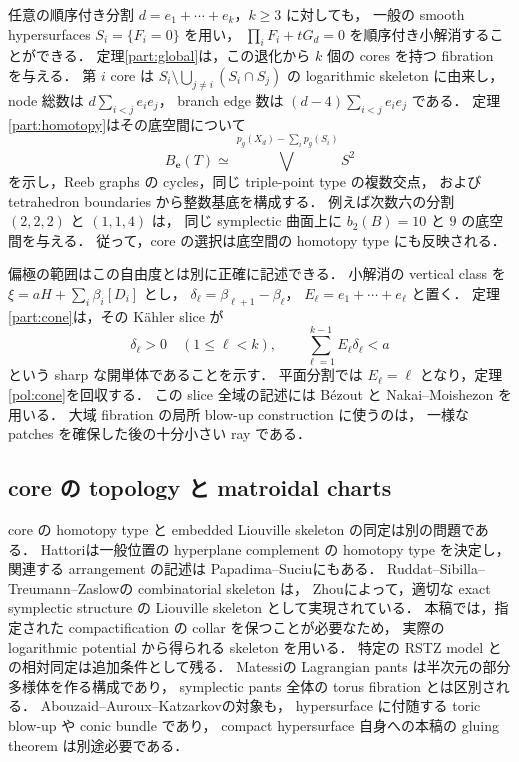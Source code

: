 任意の順序付き分割 $d=e_1+\cdots+e_k$，$k\geq3$ に対しても，
一般の smooth hypersurfaces $S_i=\{F_i=0\}$ を用い，
$\prod_iF_i+tG_d=0$ を順序付き小解消することができる．
定理\ref{part:global}は，この退化から $k$ 個の cores を持つ fibration を与える．
第 $i$ core は
$S_i\setminus\bigcup_{j\ne i}(S_i\cap S_j)$ の logarithmic skeleton に由来し，
node 総数は $d\sum_{i<j}e_i e_j$，
branch edge 数は $(d-4)\sum_{i<j}e_i e_j$ である．
定理\ref{part:homotopy}はその底空間について
\[
 B_{\mathbf e}(T)\simeq
 \bigvee^{\,p_g(X_d)-\sum_i p_g(S_i)}S^2
\]
を示し，Reeb graphs の cycles，同じ triple-point type の複数交点，
および tetrahedron boundaries から整数基底を構成する．
例えば次数六の分割 $(2,2,2)$ と $(1,1,4)$ は，
同じ symplectic 曲面上に $b_2(B)=10$ と $9$ の底空間を与える．
従って，core の選択は底空間の homotopy type にも反映される．

偏極の範囲はこの自由度とは別に正確に記述できる．
小解消の vertical class を
$\xi=aH+\sum_i\beta_i[D_i]$ とし，
$\delta_\ell=\beta_{\ell+1}-\beta_\ell$，
$E_\ell=e_1+\cdots+e_\ell$ と置く．
定理\ref{part:cone}は，その Kähler slice が
\[
 \delta_\ell>0\quad(1\leq\ell<k),\qquad
 \sum_{\ell=1}^{k-1}E_\ell\delta_\ell<a
\]
という sharp な開単体であることを示す．
平面分割では $E_\ell=\ell$ となり，定理\ref{pol:cone}を回収する．
この slice 全域の記述には Bézout と Nakai--Moishezon を用いる．
大域 fibration の局所 blow-up construction に使うのは，
一様な patches を確保した後の十分小さい ray である．

\subsection{core の topology と matroidal charts}

core の homotopy type と embedded Liouville skeleton の同定は別の問題である．
Hattori\cite{Hattori}は一般位置の hyperplane complement の homotopy type を決定し，
関連する arrangement の記述は Papadima--Suciu\cite[\S1.1]{PapadimaSuciu}にもある．
Ruddat--Sibilla--Treumann--Zaslow\cite{RSTZ}の combinatorial skeleton は，
Zhou\cite{Zhou}によって，適切な exact symplectic structure の
Liouville skeleton として実現されている．
本稿では，指定された compactification の collar を保つことが必要なため，
実際の logarithmic potential から得られる skeleton を用いる．
特定の RSTZ model との相対同定は追加条件として残る．
Matessi\cite{MatessiPants,Matessi}の Lagrangian pants は半次元の部分多様体を作る構成であり，
symplectic pants 全体の torus fibration とは区別される．
Abouzaid--Auroux--Katzarkov\cite{AAK}の対象も，
hypersurface に付随する toric blow-up や conic bundle であり，
compact hypersurface 自身への本稿の gluing theorem は別途必要である．

